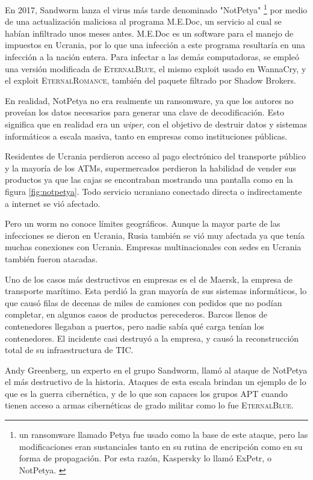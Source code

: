 \documentclass{article}
\begin{document}
En 2017, Sandworm lanza el virus más tarde denominado "NotPetya" \footnote{un ransomware llamado Petya fue usado como la base de este ataque, pero las modificaciones eran sustanciales tanto en su rutina de encripción como en su forma de propagación. Por esta razón, Kaspersky lo llamó ExPetr, o NotPetya. \autocite{kaspersky-notpetya}} por medio de una actualización maliciosa al programa M.E.Doc, un servicio al cual se habían infiltrado unos meses antes. M.E.Doc es un software para el manejo de impuestos en Ucrania, por lo que una infección a este programa resultaría en una infección a la nación entera. Para infectar a las demás computadoras, se empleó una versión modificada de \textsc{EternalBlue}, el mismo exploit usado en WannaCry, y el exploit \textsc{EternalRomance}, también del paquete filtrado por Shadow Brokers.

En realidad, NotPetya no era realmente un ransomware, ya que los autores no proveían los datos necesarios para generar una clave de decodificación. Esto significa que en realidad era un {\it wiper}, con el objetivo de destruir datos y sistemas informáticos a escala masiva, tanto en empresas como instituciones públicas.

Residentes de Ucrania perdieron acceso al pago electrónico del transporte público y la mayoría de los ATMs, supermercados perdieron la habilidad de vender sus productos ya que las cajas se encontraban mostrando una pantalla como en la figura \ref{fig:notpetya}. Todo servicio ucraniano conectado directa o indirectamente a internet se vió afectado.

Pero un worm no conoce límites geográficos. Aunque la mayor parte de las infecciones se dieron en Ucrania, Rusia también se vió muy afectada ya que tenía muchas conexiones con Ucrania. Empresas multinacionales con sedes en Ucrania también fueron atacadas. \autocite{securelist-notpetya}

Uno de los casos más destructivos en empresas es el de Maersk, la empresa de transporte marítimo. Esta perdió la gran mayoría de sus sistemas informáticos, lo que causó filas de decenas de miles de camiones con pedidos que no podían completar, en algunos casos de productos perecederos. Barcos llenos de contenedores llegaban a puertos, pero nadie sabía qué carga tenían los contenedores. El incidente casi destruyó a la empresa, y causó la reconstrucción total de su infraestructura de TIC. \autocite{darknetdiaries-notpetya}

Andy Greenberg, un experto en el grupo Sandworm, llamó al ataque de NotPetya el más destructivo de la historia. Ataques de esta escala brindan un ejemplo de lo que es la guerra cibernética, y de lo que son capaces los grupos APT cuando tienen acceso a armas cibernéticas de grado militar como lo fue \textsc{EternalBlue}. \autocite{wired-notpetya} \autocite{greenberg-sandworm} 
\end{document}
